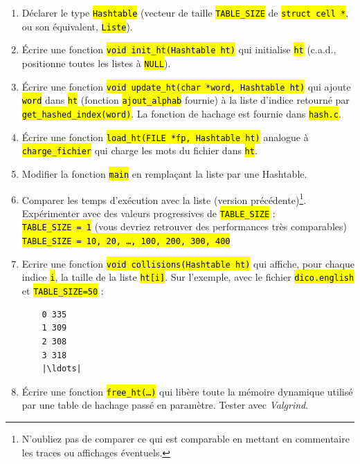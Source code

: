 \documentclass[final, pdftex, a4paper, openbib, ]{article}
\let\OldTexttt\texttt
\renewcommand{\texttt}[1]{\OldTexttt{\hl{#1}}}
\begin{document}
\begin{enumerate}
	\item Déclarer le type \texttt{Hashtable} (vecteur de taille \texttt{TABLE\_SIZE} de \texttt{struct cell *}, ou son équivalent, \texttt{Liste}).
	\item Écrire une fonction \texttt{void init\_ht(Hashtable ht)} qui initialise \texttt{ht} (c.a.d., positionne toutes les listes à \texttt{NULL}).
	\item Écrire une fonction \texttt{void update\_ht(char *word, Hashtable ht)} qui ajoute \texttt{word} dans \texttt{ht} (fonction \texttt{ajout\_alphab} fournie) à la liste d'indice retourné par \texttt{get\_hashed\_index(word)}.
	La fonction de hachage est fournie dans \texttt{hash.c}.
	\item Écrire une fonction \texttt{load\_ht(FILE *fp, Hashtable ht)} analogue à \texttt{charge\_fichier} qui charge les mots du fichier dans \texttt{ht}.
	\item Modifier la fonction \texttt{main} en remplaçant la liste par une Hashtable.
	\item Comparer les temps d'exécution avec la liste (version précédente)\footnote{N'oubliez pas de comparer ce qui est comparable en mettant en commentaire les traces ou affichages éventuels.}. Expérimenter avec des valeurs progressives de \texttt{TABLE\_SIZE} :\\
	\texttt{TABLE\_SIZE = 1} (vous devriez retrouver des performances très comparables)\\
	\texttt{TABLE\_SIZE = 10, 20, \ldots, 100, 200, 300, 400}
	\item Ecrire une fonction \texttt{void collisions(Hashtable ht)} qui affiche, pour chaque indice \texttt{i}, la taille de la liste \texttt{ht[i]}.
	Sur l'exemple, avec le fichier \texttt{dico.english} et \texttt{TABLE\_SIZE=50} : %
	\begin{verbatim}
	0 335
	1 309
	2 308
	3 318
	|\ldots|
	\end{verbatim}

	\item Écrire une fonction \texttt{free\_ht(\ldots)} qui libère toute la mémoire dynamique utilisé par une table de hachage passé en paramètre. Tester avec \textit{Valgrind}.
\end{enumerate}
\end{document}
